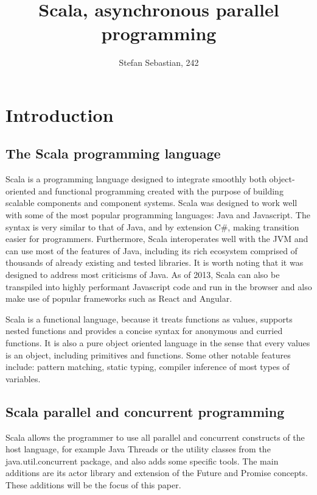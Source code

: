 \documentclass[12pt]{article}
\begin{document}
	\title{Scala, asynchronous parallel programming}
	\author{Stefan Sebastian, 242}
	\date{}
	\maketitle
	
	\newpage
	\tableofcontents
	\newpage

	\section{Introduction}
	
	\subsection{The Scala programming language}
	Scala is a programming language designed to integrate smoothly both object-oriented and 
	functional programming created with the purpose 
	of building scalable components and component systems\cite{AnOverviewOfTheScalaProgrammingLanguage}. 
	Scala was designed to work well with some of the most popular programming languages: Java and Javascript. 
	The syntax is very similar to that of Java, and by extension C\#, making transition 
	easier for programmers. Furthermore, Scala interoperates well with the JVM and can use most of the features 
	of Java, including its rich ecosystem comprised of thousands of already existing 
	and tested libraries. It is worth noting that it was designed to address most criticisms of Java.
	As of 2013, Scala can also be transpiled into highly performant 
	Javascript code and run in the browser\cite{ScalaJs} and also make use of popular frameworks such as
	React and Angular.

	Scala is a functional language, because it treats functions as values, supports nested 
	functions and provides a concise syntax for anonymous and curried functions\cite{AnOverviewOfTheScalaProgrammingLanguage}.
	It is also a pure object oriented language in the sense that every values is an object, including primitives and functions. 
	Some other notable features include: pattern matching, static typing, compiler inference of most types of variables.

	\subsection{Scala parallel and concurrent programming}

	Scala allows the programmer to use all parallel and concurrent constructs of the host language, for example 
	Java Threads or the utility classes from the java.util.concurrent package, and also adds some specific tools.
	The main additions are its actor library and extension of the Future and Promise concepts. These additions 
	will be the focus of this paper.
\end{document}
